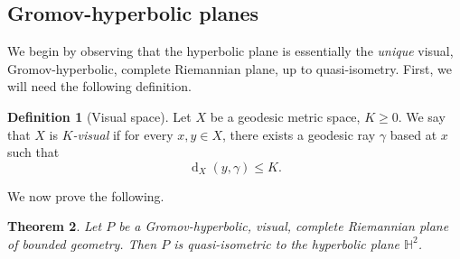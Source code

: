 \documentclass[11pt,a4paper]{amsart}
\DeclareMathOperator{\dist}{d}
\newcommand{\bbH}{\mathbb{H}}
\newtheorem{theorem}{Theorem}[section]%
\theoremstyle{definition}
\newtheorem{definition}[theorem]{Definition}
\begin{document}
\subsection{Gromov-hyperbolic planes}

We begin by observing that the hyperbolic plane is essentially the \emph{unique} visual, Gromov-hyperbolic, complete Riemannian plane, up to quasi-isometry.
First, we will need the following definition.

\begin{definition}[Visual space]
    Let $X$ be a geodesic metric space, $K \geq 0$. We say that $X$ is \emph{$K$-visual} if for every $x, y \in X$, there exists a geodesic ray $\gamma$ based at $x$ such that 
    $$
    \dist_X(y,\gamma) \leq K.
    $$
\end{definition}

We now prove the following.


\begin{theorem}\label{thm:planes-QI-to-hypplane}
    Let $P$ be a Gromov-hyperbolic, visual, complete Riemannian plane of bounded geometry. Then $P$ is quasi-isometric to the hyperbolic plane $\bbH^2$. 
\end{theorem}
\end{document}
